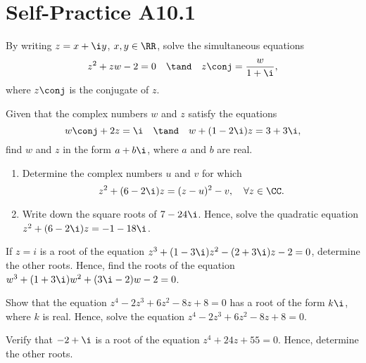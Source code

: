 \section{Self-Practice A10.1}

\begin{problem}
    By writing $z = x + \i y$, $x, y \in \RR$, solve the simultaneous equations \[z^2 + zw - 2 = 0 \quad \tand \quad z\conj = \frac{w}{1 + \i},\] where $z\conj$ is the conjugate of $z$.
\end{problem}

\begin{problem}
    Given that the complex numbers $w$ and $z$ satisfy the equations \[w\conj + 2z = \i \quad \tand \quad w + (1 - 2\i)z = 3 + 3\i,\] find $w$ and $z$ in the form $a + b \i$, where $a$ and $b$ are real.
\end{problem}

\begin{problem}
    \begin{enumerate}
        \item Determine the complex numbers $u$ and $v$ for which \[z^2 + (6-2\i)z = (z-u)^2 - v, \quad \forall z \in \CC.\]
        \item Write down the square roots of $7 - 24\i$. Hence, solve the quadratic equation $z^2 + (6-2\i)z = -1 - 18\i$.
    \end{enumerate}
\end{problem}

\begin{problem}
    If $z = i$ is a root of the equation $z^3 + (1-3\i)z^2 - (2+3\i)z - 2 = 0$, determine the other roots. Hence, find the roots of the equation $w^3 + (1 + 3\i)w^2 + (3\i-2)w - 2 = 0$.
\end{problem}

\begin{problem}
    Show that the equation $z^4 - 2z^3 + 6z^2 - 8z + 8 = 0$ has a root of the form $k\i$, where $k$ is real. Hence, solve the equation $z^4 - 2z^3 + 6z^2 - 8z + 8 = 0$.
\end{problem}

\begin{problem}
    Verify that $-2 + \i$ is a root of the equation $z^4 + 24z + 55 = 0$. Hence, determine the other roots.
\end{problem}